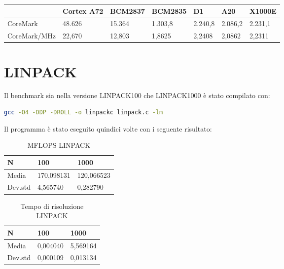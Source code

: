 \documentclass[12pt,a4paper]{report}
\begin{document}
\begin{table}
\centering
\begin{tabular}{|l|l|l|l|l|l|l|}
\hline
&
  Cortex A72 &
  BCM2837 &
  BCM2835 &
  D1 &
  A20 &
  X1000E 
  \\ \hline
CoreMark      & 48.626             & 15.364        & 1.303,8  & 2.240,8    & 2.086,2       & 2.231,1             \\ \hline
CoreMark/MHz                            & 22,670             & 12,803        & 1,8625   & 2,2408     & 2,0862        & 2,2311               \\ \hline
\end{tabular}
\end{table}

\section{LINPACK}
Il benchmark sia nella versione LINPACK100 che LINPACK1000 è stato compilato con:

\begin{lstlisting}[language=sh, caption = {compilazione LINPACK}, captionpos = b]
gcc -O4 -DDP -DROLL -o linpackc linpack.c -lm
\end{lstlisting}


Il programma è stato eseguito quindici volte con i seguente risultato:

\begin{table}[ht]
\centering
\begin{tabular}{|l|l|l|}
\hline
N       & 100        & 1000       \\ \hline
Media   & 170,098131 & 120,066523 \\ \hline
Dev.std & 4,565740   & 0,282790   \\ \hline
\end{tabular}
\caption{MFLOPS LINPACK}
\end{table}

\begin{table}[ht]
\centering
\begin{tabular}{|l|l|l|}
\hline
N       & 100      & 1000     \\ \hline
Media   & 0,004040 & 5,569164 \\ \hline
Dev.std & 0,000109 & 0,013134 \\ \hline
\end{tabular}
\caption{Tempo di risoluzione LINPACK}
\end{table}
\end{document}
